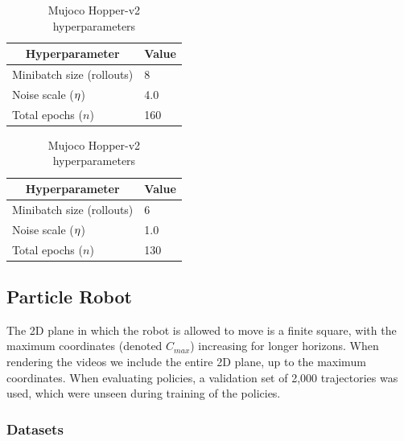 \documentclass[nohyperref]{article}
\begin{document}
\begin{table}[h]
    \begin{minipage}[c]{0.5\textwidth}
    \centering
    \caption{Particle \& Reacher-v2 hyperparameters}
    \label{table:particle_reacher_hps}
        \begin{tabular}{l|l}
        \hline
        \multicolumn{1}{c|}{Hyperparameter} & \multicolumn{1}{c}{Value} \\ \hline
        Minibatch size (rollouts)           & 8                         \\
        Noise scale ($\eta$)              & 4.0                       \\
        Total epochs ($n$)                  & 160                      
        \end{tabular}
    \end{minipage}
    \begin{minipage}[c]{0.5\textwidth}
    \centering
    \caption{Mujoco Hopper-v2 hyperparameters}
    \label{table:hopper_hps}
        \begin{tabular}{l|l}
        \hline
        \multicolumn{1}{c|}{Hyperparameter} & \multicolumn{1}{c}{Value} \\ \hline
        Minibatch size (rollouts)           & 6                         \\
        Noise scale ($\eta$)              & 1.0                       \\
        Total epochs ($n$)                  & 130                      
        \end{tabular}
    \end{minipage}
\end{table}



\subsection{Particle Robot}
The 2D plane in which the robot is allowed to move is a finite square, with the maximum coordinates (denoted $C_{max}$) increasing for longer horizons. When rendering the videos we include the entire 2D plane, up to the maximum coordinates. When evaluating policies, a validation set of 2,000 trajectories was used, which were unseen during training of the policies.


\subsubsection{Datasets}
\label{particle:datasets}
\end{document}
